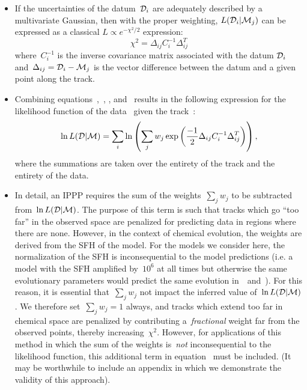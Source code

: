 \documentclass[ms.tex]{subfiles}
\begin{document}
\begin{itemize}
	\item If the uncertainties of the datum~$\mathcal{D}_i$ are adequately
	described by a multivariate Gaussian, then with the proper weighting,
	$L(\mathcal{D}_i | \mathcal{M}_j)$ can be expressed as a classical
	$L \propto e^{-\chi^2 / 2}$ expression:
	\begin{equation}
	\label{eq:chi_squared}
	\chi^2 = \Delta_{ij} C_i^{-1} \Delta_{ij}^T
	\end{equation}
	where~$C_i^{-1}$ is the inverse covariance matrix associated with the datum
	$\mathcal{D}_i$ and~$\Delta_{ij} = \mathcal{D}_i - \mathcal{M}_j$ is the
	vector difference between the datum and a given point along the track.

	\item Combining equations~,~,
	, and~ results in the following
	expression for the likelihood function of the data~ given the
	track~:
	\begin{equation}
	\label{eq:likelihood_func}
	\ln L(\mathcal{D} | \mathcal{M}) = \sum_i \ln \left(
	\sum_j w_j \exp\left(\frac{-1}{2}\Delta_{ij} C_i^{-1} \Delta_{ij}^T\right)
	\right),
	\end{equation}
	where the summations are taken over the entirety of the track and the
	entirety of the data.

	\item In detail, an IPPP requires the sum of the weights~$\sum_j w_j$ to be
	subtracted from~$\ln L(\mathcal{D} | \mathcal{M})$.
	The purpose of this term is such that tracks which go ``too far'' in the
	observed space are penalized for predicting data in regions where there are
	none.
	However, in the context of chemical evolution, the weights are derived from
	the SFH of the model.
	For the models we consider here, the normalization of the SFH is
	inconsequential to the model predictions (i.e. a model with the SFH
	amplified by~$10^6$ at all times but otherwise the same evolutionary
	parameters would predict the same evolution in~\feh~and~\afe).
	For this reason, it is essential that~$\sum_j w_j$ not impact the inferred
	value of~$\ln L(\mathcal{D} | \mathcal{M})$.
	We therefore set~$\sum_j w_j = 1$ always, and tracks which extend too far
	in chemical space are penalized by contributing a~\textit{fractional}
	weight far from the observed points, thereby increasing~$\chi^2$.
	However, for applications of this method in which the sum of the weights
	is~\textit{not} inconsequential to the likelihood function, this additional
	term in equation~ must be included.
	{\color{red}(It may be worthwhile to include an appendix in which we
	demonstrate the validity of this approach)}.


\end{itemize}
\end{document}
